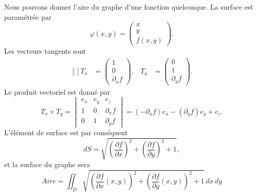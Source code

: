 \begin{example}
	Nous pouvons donner l'aire du graphe d'une fonction quelconque. La surface est paramétrée par
	\begin{equation}
		\varphi(x,y)=\begin{pmatrix}
			x \\
			y \\
			f(x,y)
		\end{pmatrix}.
	\end{equation}
	Les vecteurs tangents sont
	\begin{equation}
		\begin{aligned}[]
			T_x & =\begin{pmatrix}
				       1 \\
				       0 \\
				       \partial_xf
			       \end{pmatrix}, & T_y & =\begin{pmatrix}
				                               0 \\
				                               1 \\
				                               \partial_yf
			                               \end{pmatrix}.
		\end{aligned}
	\end{equation}
	Le produit vectoriel est donné par
	\begin{equation}
		T_x\times T_y=\begin{vmatrix}
			e_x & e_y & e_z         \\
			1   & 0   & \partial_xf \\
			0   & 1   & \partial_yf
		\end{vmatrix}=(-\partial_xf)e_x-(\partial_yf)e_y+e_z.
	\end{equation}
	L'élément de surface est par conséquent
	\begin{equation}
		dS=\sqrt{\left( \frac{ \partial f }{ \partial x } \right)^2+\left( \frac{ \partial f }{ \partial y } \right)^2+1},
	\end{equation}
	et la surface du graphe sera
	\begin{equation}
		Aire=\iint_D\sqrt{\left( \frac{ \partial f }{ \partial x }(x,y) \right)^2+\left( \frac{ \partial f }{ \partial y }(x,y) \right)^2+1}\,dx\,dy
	\end{equation}

\end{example}

